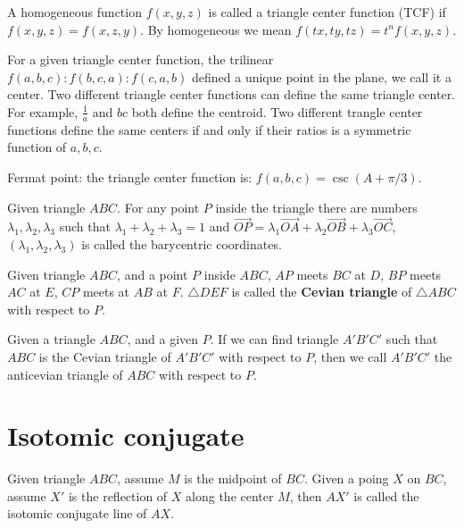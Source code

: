 \begin{definition}
A homogeneous function $f(x,y, z)$ is called a triangle center function (TCF) if $f(x, y, z)=f(x, z, y)$.
By homogeneous we mean $f(tx,ty,tz)=t^nf(x,y,z)$.
\end{definition}

For a given triangle center function, the trilinear $f(a,b,c):f(b,c,a):f(c,a,b)$ defined a unique point in the plane, we call it a
center. 
Two different triangle center functions can define the same triangle center. 
For example, $\frac1a$ and $bc$ both define the centroid. Two different trangle center functions define the same centers if and only 
if their ratios is a symmetric function of $a, b, c$.

Fermat point: the triangle center function is: $f(a,b,c)=\csc(A+\pi/3)$.


\begin{definition}
Given triangle $ABC$. For any point $P$ inside the triangle there are numbers $\lambda_1, \lambda_2, \lambda_3$
such that $\lambda_1+\lambda_2+\lambda_3=1$ and $\overrightarrow {OP}=\lambda_1\overrightarrow{OA}+\lambda_2\overrightarrow{OB}
+\lambda_3\overrightarrow{OC}$, $(\lambda_1, \lambda_2, \lambda_3)$ is called the barycentric coordinates.
\end{definition}


\begin{definition}
Given triangle $ABC$, and a point $P$ inside $ABC$, $AP$ meets $BC$ at $D$, $BP$ meets $AC$ at $E$,
$CP$ meets at $AB$ at $F$. $\triangle DEF$ is called the {\bf Cevian triangle} of $\triangle ABC$ with respect to $P$.
\end{definition}


\begin{definition}
Given a triangle $ABC$, and a given $P$. If we can find triangle $A'B'C'$ such that $ABC$ is the Cevian triangle
of  $A'B'C'$ with respect to $P$, then we call $A'B'C'$ the anticevian triangle of $ABC$ with respect to $P$.

\end{definition}


\section{Isotomic conjugate}
Given triangle $ABC$, assume $M$ is the midpoint of $BC$. Given a poing $X$ on $BC$, assume $X'$ is the reflection of $X$ along
the center $M$, then $AX'$ is called the isotomic conjugate line of $AX$.


